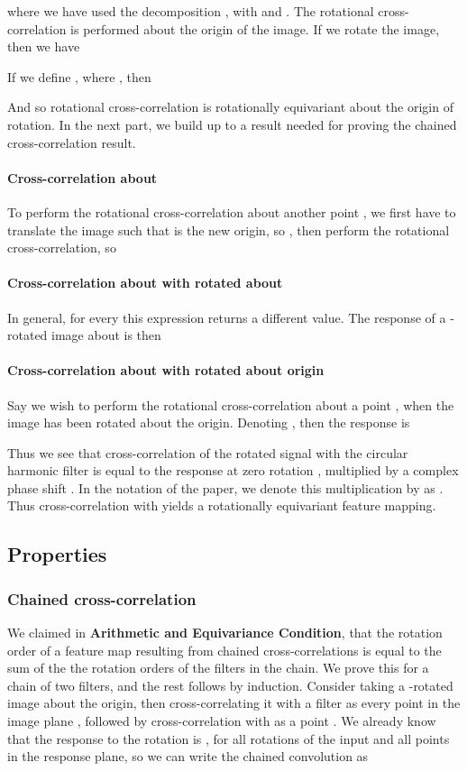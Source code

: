 \documentclass[10pt,twocolumn,letterpaper]{article}
\newcommand{\bb}[1]{\textbf{#1}}
\begin{document}
where we have used the decomposition , with  and . The rotational cross-correlation is performed about the origin of the image. If we rotate the image, then we have

If we define , where , then

And so rotational cross-correlation is rotationally equivariant about the origin of rotation. In the next part, we build up to a result needed for proving the chained cross-correlation result.
\paragraph{Cross-correlation about }
To perform the rotational cross-correlation about another point , we first have to translate the image such that  is the new origin, so , then perform the rotational cross-correlation, so

\paragraph{Cross-correlation about  with rotated  about }
In general, for every  this expression returns a different value. The response of a -rotated image about  is then

\paragraph{Cross-correlation about  with rotated  about origin}
Say we wish to perform the rotational cross-correlation about a point , when the image has been rotated about the origin. Denoting , then the response is



Thus we see that cross-correlation of the rotated signal  with the circular harmonic filter  is equal to the response at zero rotation , multiplied by a complex phase shift . In the notation of the paper, we denote this multiplication by  as . Thus cross-correlation with  yields a rotationally equivariant feature mapping.

\subsection{Properties}
\subsubsection{Chained cross-correlation}
We claimed in \bb{Arithmetic and Equivariance Condition}, that the rotation order of a feature map resulting from chained cross-correlations is equal to the sum of the the rotation orders of the filters in the chain. We prove this for a chain of two filters, and the rest follows by induction. Consider taking a -rotated image  about the origin, then cross-correlating it with a filter  as every point in the image plane , followed by cross-correlation with  as a point . We already know that the response to the rotation is , for all rotations  of the input and all points  in the response plane, so we can write the chained convolution as 
\end{document}

